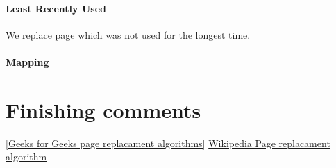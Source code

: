 \documentclass{article}
\begin{document}
\paragraph{Least Recently Used}
We replace page which was not used for the longest time. 
\cite{Page Replacamanet Algorithms}
\cite{pageWiki}
\paragraph{Mapping}


\section{Finishing comments}
\begin{thebibliography}{9}
\href{https://www.geeksforgeeks.org/page-replacement-algorithms-in-operating-systems/}{[Geeks
for Geeks page replacament algorithms]}
\href{https://en.wikipedia.org/wiki/Page_replacement_algorithm}{Wikipedia Page
replacament algorithm}
\end{thebibliography}
\end{document}

